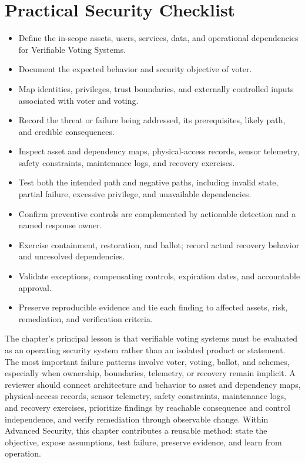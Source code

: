\documentclass[11pt]{article}
\begin{document}
\section*{Practical Security Checklist}
\begin{itemize}[label=$\square$]
\item Define the in-scope assets, users, services, data, and operational dependencies for Verifiable Voting Systems.
\item Document the expected behavior and security objective of voter.
\item Map identities, privileges, trust boundaries, and externally controlled inputs associated with voter and voting.
\item Record the threat or failure being addressed, its prerequisites, likely path, and credible consequences.
\item Inspect asset and dependency maps, physical-access records, sensor telemetry, safety constraints, maintenance logs, and recovery exercises.
\item Test both the intended path and negative paths, including invalid state, partial failure, excessive privilege, and unavailable dependencies.
\item Confirm preventive controls are complemented by actionable detection and a named response owner.
\item Exercise containment, restoration, and ballot; record actual recovery behavior and unresolved dependencies.
\item Validate exceptions, compensating controls, expiration dates, and accountable approval.
\item Preserve reproducible evidence and tie each finding to affected assets, risk, remediation, and verification criteria.
\end{itemize}
\begin{synthesisbox}
The chapter's principal lesson is that verifiable voting systems must be evaluated as an operating security system rather than an isolated product or statement. The most important failure patterns involve voter, voting, ballot, and schemes, especially when ownership, boundaries, telemetry, or recovery remain implicit. A reviewer should connect architecture and behavior to asset and dependency maps, physical-access records, sensor telemetry, safety constraints, maintenance logs, and recovery exercises, prioritize findings by reachable consequence and control independence, and verify remediation through observable change. Within Advanced Security, this chapter contributes a reusable method: state the objective, expose assumptions, test failure, preserve evidence, and learn from operation.
\end{synthesisbox}
\end{document}
